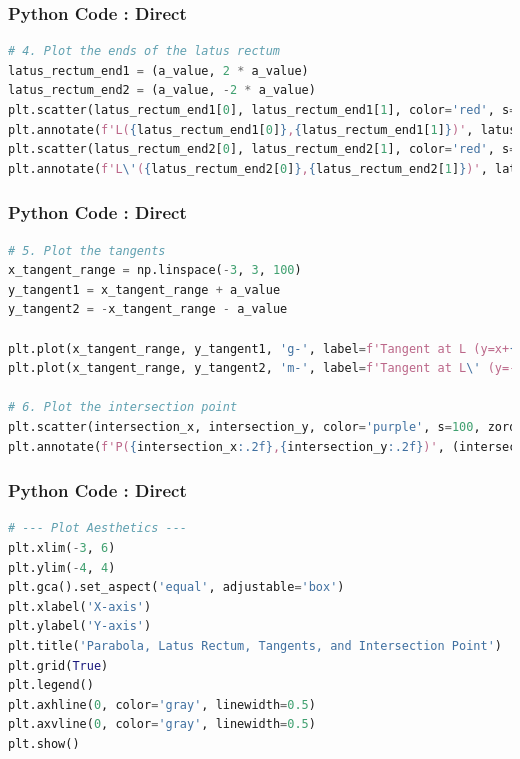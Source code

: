 \documentclass{beamer}
\begin{document}
\begin{frame}[fragile]
\frametitle{Python Code : Direct}
\begin{lstlisting}[language=Python]
# 4. Plot the ends of the latus rectum
latus_rectum_end1 = (a_value, 2 * a_value)
latus_rectum_end2 = (a_value, -2 * a_value)
plt.scatter(latus_rectum_end1[0], latus_rectum_end1[1], color='red', s=100, zorder=5, label=f'End L ({latus_rectum_end1[0]},{latus_rectum_end1[1]})')
plt.annotate(f'L({latus_rectum_end1[0]},{latus_rectum_end1[1]})', latus_rectum_end1, textcoords="offset points", xytext=(5,5), ha='left')
plt.scatter(latus_rectum_end2[0], latus_rectum_end2[1], color='red', s=100, zorder=5, label=f'End L\' ({latus_rectum_end2[0]},{latus_rectum_end2[1]})')
plt.annotate(f'L\'({latus_rectum_end2[0]},{latus_rectum_end2[1]})', latus_rectum_end2, textcoords="offset points", xytext=(5,-5), ha='right')
\end{lstlisting}
\end{frame}

\begin{frame}[fragile]
\frametitle{Python Code : Direct}
\begin{lstlisting}[language=Python]
# 5. Plot the tangents
x_tangent_range = np.linspace(-3, 3, 100)
y_tangent1 = x_tangent_range + a_value
y_tangent2 = -x_tangent_range - a_value

plt.plot(x_tangent_range, y_tangent1, 'g-', label=f'Tangent at L (y=x+{a_value})')
plt.plot(x_tangent_range, y_tangent2, 'm-', label=f'Tangent at L\' (y=-x-{a_value})')

# 6. Plot the intersection point
plt.scatter(intersection_x, intersection_y, color='purple', s=100, zorder=6, label=f'Intersection ({intersection_x:.2f},{intersection_y:.2f})')
plt.annotate(f'P({intersection_x:.2f},{intersection_y:.2f})', (intersection_x, intersection_y), textcoords="offset points", xytext=(10, -15), ha='left', color='purple', fontsize=12)
\end{lstlisting}
\end{frame}

\begin{frame}[fragile]
\frametitle{Python Code : Direct}
\begin{lstlisting}[language=Python]
# --- Plot Aesthetics ---
plt.xlim(-3, 6)
plt.ylim(-4, 4)
plt.gca().set_aspect('equal', adjustable='box')
plt.xlabel('X-axis')
plt.ylabel('Y-axis')
plt.title('Parabola, Latus Rectum, Tangents, and Intersection Point')
plt.grid(True)
plt.legend()
plt.axhline(0, color='gray', linewidth=0.5)
plt.axvline(0, color='gray', linewidth=0.5)
plt.show()
\end{lstlisting}
\end{frame}
\end{document}

